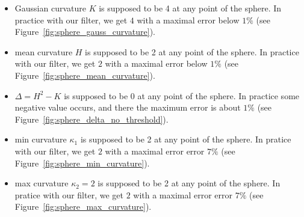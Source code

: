 \documentclass{InsightArticle}
\theoremstyle{plain}
\begin{document}
\begin{itemize}
  \item Gaussian curvature $K$ is supposed to be 4 at any point of the sphere. In practice with our filter, we get $4$ with a maximal error below $1\%$ (see Figure~\ref{fig:sphere_gauss_curvature}).
  \item mean curvature $H$ is supposed to be 2 at any point of the sphere. In practice with our filter, we get $2$ with a maximal error below $1\%$ (see Figure~\ref{fig:sphere_mean_curvature}).
  \item $\Delta = H^2 - K$ is supposed to be 0 at any point of the sphere. In practice some negative value occurs, and there the maximum error is about $1\%$ (see Figure~\ref{fig:sphere_delta_no_threshold}).
  \item min curvature $\kappa_1$ is supposed to be 2 at any point of the sphere. In pratice with our filter, we get $2$ with a maximal error error $7\%$ (see Figure~\ref{fig:sphere_min_curvature}).
  \item max curvature $\kappa_2=2$ is supposed to be 2 at any point of the sphere. In pratice with our filter, we get $2$ with a maximal error error $7\%$ (see Figure~\ref{fig:sphere_max_curvature}).
\end{itemize}
\end{document}
